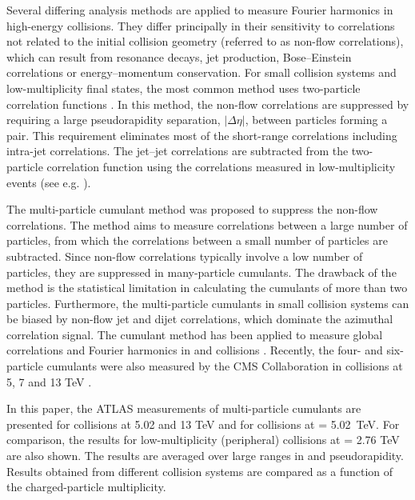 \documentclass[cernpreprint,texlive=2014,txfonts,UKenglish]{latex/atlasdoc}
\begin{document}
 
Several differing analysis methods are applied to measure Fourier harmonics in high-energy collisions. They differ principally in their sensitivity to correlations not related to the initial collision geometry (referred to as non-flow correlations), which can result from resonance decays, jet production, Bose--Einstein correlations or energy--momentum conservation. For small collision systems and low-multiplicity final states, the most common method uses two-particle correlation functions \cite{phenix2p,pPbcms1,pPbalice1,pPbatlas1,pPbcms2,pPbatlas3,pPbcms3,pPbLHCb1,pPbcms4,
ppcms1,ppatlas1,ppcms2,ppcms3,ppatlas2}.  In this method,  the non-flow correlations are suppressed by requiring a large pseudorapidity separation,  $|\Delta\eta|$, between particles forming a pair.  This requirement eliminates most of the short-range correlations including intra-jet correlations. The jet--jet correlations are subtracted from the two-particle correlation function using the correlations measured in low-multiplicity events (see  e.g. \cite{ppatlas1,ppatlas2}). 

The multi-particle cumulant method \cite{Borghini:2000,Borghini:2001,Snellings} was proposed to suppress the non-flow correlations. The method aims to measure correlations between a large number of particles, from which the correlations between a small number of particles are subtracted. Since non-flow correlations typically involve a low number of particles, they are suppressed in many-particle cumulants. The drawback of the method is the statistical limitation in calculating the cumulants of more than two particles. Furthermore, the multi-particle cumulants in small collision systems can be biased by non-flow jet and dijet correlations, which dominate the azimuthal correlation signal.  The cumulant method has been applied to measure global correlations and Fourier harmonics in \PbPb and \pPb collisions \cite{Alice9,Atlas6,pPbatlas2,pPbcms2,pPbcms3}. Recently, the four- and six-particle cumulants were also  measured by the CMS Collaboration in \pp collisions at 5, 7 and 13 TeV \cite{ppcms3}. 

In this paper, the ATLAS measurements of multi-particle cumulants are presented for \pp collisions at 5.02 and 13 TeV and for \pPb collisions at \sqn= 5.02~TeV. For comparison, the results for low-multiplicity (peripheral)  \PbPb collisions at \sqn= 2.76 TeV are also shown. The results are averaged over large ranges in \pT and pseudorapidity. Results obtained from different collision systems are compared as a function of the charged-particle multiplicity.
\end{document}
